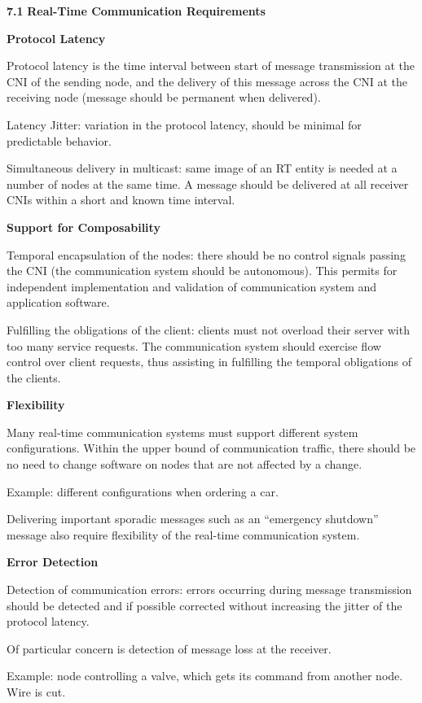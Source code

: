 \textbf{7.1} \protect\hypertarget{teil2}{}{}\textbf{Real-Time
Communication Requirements}

\textbf{Protocol Latency}

Protocol latency is the time interval between start of message
transmission at the CNI of the sending node, and the delivery of this
message across the CNI at the receiving node (message should be
permanent when delivered).

Latency Jitter: variation in the protocol latency, should be minimal for
predictable behavior.

Simultaneous delivery in multicast: same image of an RT entity is needed
at a number of nodes at the same time. A message should be delivered at
all receiver CNIs within a short and known time interval.

\textbf{Support for Composability}

Temporal encapsulation of the nodes: there should be no control signals
passing the CNI (the communication system should be autonomous). This
permits for independent implementation and validation of communication
system and application software.

Fulfilling the obligations of the client: clients must not overload
their server with too many service requests. The communication system
should exercise flow control over client requests, thus assisting in
fulfilling the temporal obligations of the clients.

\textbf{Flexibility}

Many real-time communication systems must support different system
configurations. Within the upper bound of communication traffic, there
should be no need to change software on nodes that are not affected by a
change.

Example: different configurations when ordering a car.

Delivering important sporadic messages such as an ``emergency shutdown''
message also require flexibility of the real-time communication system.

\textbf{Error Detection}

\protect\hypertarget{OLEux5fLINK1}{}{}Detection of communication errors:
errors occurring during message transmission should be detected and if
possible corrected without increasing the jitter of the protocol
latency.

Of particular concern is detection of message loss at the receiver.

Example: node controlling a valve, which gets its command from another
node. Wire is cut.

